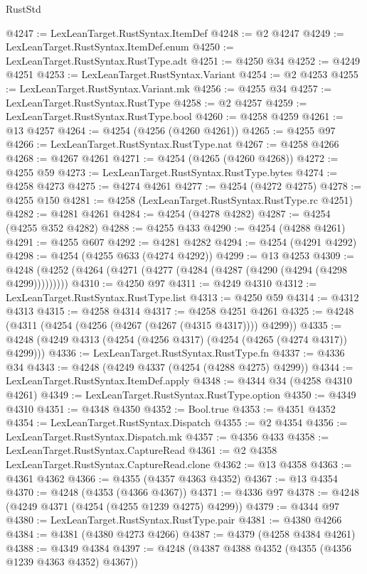 \begin{lexlean}{RustStd}
\begin{coremodule}
{\begin{coremodule}
{{{{{{{{{{{{{{{{{{{{{{{{{{{{{{{{{{{{{{{{{{{{{{{{{{{{{{{@4247 := LexLeanTarget.RustSyntax.ItemDef
@4248 := @2 @4247
@4249 := LexLeanTarget.RustSyntax.ItemDef.enum
@4250 := LexLeanTarget.RustSyntax.RustType.adt
@4251 := @4250 @34
@4252 := @4249 @4251
@4253 := LexLeanTarget.RustSyntax.Variant
@4254 := @2 @4253
@4255 := LexLeanTarget.RustSyntax.Variant.mk
@4256 := @4255 @34
@4257 := LexLeanTarget.RustSyntax.RustType
@4258 := @2 @4257
@4259 := LexLeanTarget.RustSyntax.RustType.bool
@4260 := @4258 @4259
@4261 := @13 @4257
@4264 := @4254 (@4256 (@4260 @4261))
@4265 := @4255 @97
@4266 := LexLeanTarget.RustSyntax.RustType.nat
@4267 := @4258 @4266
@4268 := @4267 @4261
@4271 := @4254 (@4265 (@4260 @4268))
@4272 := @4255 @59
@4273 := LexLeanTarget.RustSyntax.RustType.bytes
@4274 := @4258 @4273
@4275 := @4274 @4261
@4277 := @4254 (@4272 @4275)
@4278 := @4255 @150
@4281 := @4258 (LexLeanTarget.RustSyntax.RustType.rc @4251)
@4282 := @4281 @4261
@4284 := @4254 (@4278 @4282)
@4287 := @4254 (@4255 @352 @4282)
@4288 := @4255 @433
@4290 := @4254 (@4288 @4261)
@4291 := @4255 @607
@4292 := @4281 @4282
@4294 := @4254 (@4291 @4292)
@4298 := @4254 (@4255 @633 (@4274 @4292))
@4299 := @13 @4253
@4309 := @4248 (@4252 (@4264 (@4271 (@4277 (@4284 (@4287 (@4290 (@4294 (@4298 @4299)))))))))
@4310 := @4250 @97
@4311 := @4249 @4310
@4312 := LexLeanTarget.RustSyntax.RustType.list
@4313 := @4250 @59
@4314 := @4312 @4313
@4315 := @4258 @4314
@4317 := @4258 @4251 @4261
@4325 := @4248 (@4311 (@4254 (@4256 (@4267 (@4267 (@4315 @4317)))) @4299))
@4335 := @4248 (@4249 @4313 (@4254 (@4256 @4317) (@4254 (@4265 (@4274 @4317)) @4299)))
@4336 := LexLeanTarget.RustSyntax.RustType.fn
@4337 := @4336 @34
@4343 := @4248 (@4249 @4337 (@4254 (@4288 @4275) @4299))
@4344 := LexLeanTarget.RustSyntax.ItemDef.apply
@4348 := @4344 @34 (@4258 @4310 @4261)
@4349 := LexLeanTarget.RustSyntax.RustType.option
@4350 := @4349 @4310
@4351 := @4348 @4350
@4352 := Bool.true
@4353 := @4351 @4352
@4354 := LexLeanTarget.RustSyntax.Dispatch
@4355 := @2 @4354
@4356 := LexLeanTarget.RustSyntax.Dispatch.mk
@4357 := @4356 @433
@4358 := LexLeanTarget.RustSyntax.CaptureRead
@4361 := @2 @4358 LexLeanTarget.RustSyntax.CaptureRead.clone
@4362 := @13 @4358
@4363 := @4361 @4362
@4366 := @4355 (@4357 @4363 @4352)
@4367 := @13 @4354
@4370 := @4248 (@4353 (@4366 @4367))
@4371 := @4336 @97
@4378 := @4248 (@4249 @4371 (@4254 (@4255 @1239 @4275) @4299))
@4379 := @4344 @97
@4380 := LexLeanTarget.RustSyntax.RustType.pair
@4381 := @4380 @4266
@4384 := @4381 (@4380 @4273 @4266)
@4387 := @4379 (@4258 @4384 @4261)
@4388 := @4349 @4384
@4397 := @4248 (@4387 @4388 @4352 (@4355 (@4356 @1239 @4363 @4352) @4367))
}}}}}}}}}}}}}}}}}}}}}}}}}}}}}}}}}}}}}}}}}}}}}}}}}}}}}}}
\end{coremodule}}
\end{coremodule}
\end{lexlean}
